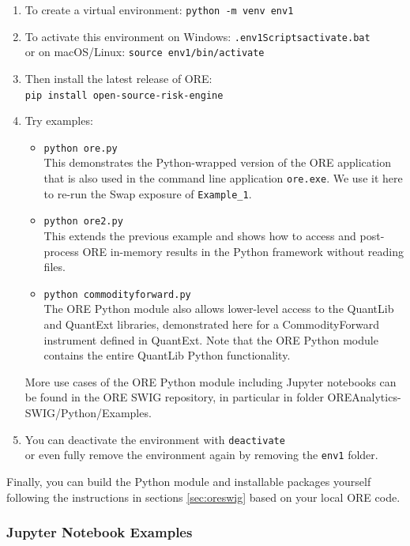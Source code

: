 \begin{enumerate}
\item To create a virtual environment: {\tt python -m venv env1} 
\item To activate this environment on Windows: {\tt .{\bs}env1{\bs}Scripts{\bs}activate.bat}  \\
or on macOS/Linux: {\tt source env1/bin/activate }  
\item Then install the latest release of ORE:\\
{\tt pip install open-source-risk-engine } 
\item Try examples:\\
  \begin{itemize} 
  \item {\tt python ore.py} \\
    This demonstrates the Python-wrapped version of the ORE application that is also used in the command line application
    {\tt ore.exe}. We use it here to re-run the Swap exposure of {\tt Example\_1}. 
  \item {\tt python ore2.py} \\
    This extends the previous example and shows how to access and post-process ORE in-memory results in the Python
    framework without reading files. 
  \item {\tt python commodityforward.py} \\
    The ORE Python module also allows lower-level access to the QuantLib and QuantExt libraries, demonstrated here for
    a CommodityForward instrument defined in QuantExt. 
    Note that the ORE Python module contains the entire QuantLib Python functionality.
  \end{itemize}
  More use cases of the ORE Python module including Jupyter notebooks can be found in the ORE SWIG repository,
  in particular in folder OREAnalytics-SWIG/Python/Examples. 
\item You can deactivate the environment with {\tt deactivate} \\
  or even fully remove the environment again by removing the {\tt env1} folder.
\end{enumerate}

Finally, you can build the Python module and installable packages yourself following the instructions in sections
\ref{sec:oreswig} based on your local ORE code. 

\subsubsection*{Jupyter Notebook Examples}

